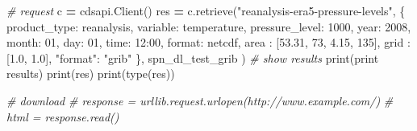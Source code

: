 \documentclass[
]{book}
\newenvironment{Shaded}{\begin{snugshade}}{\end{snugshade}}
\newcommand{\BuiltInTok}[1]{#1}
\newcommand{\CommentTok}[1]{\textcolor[rgb]{0.56,0.35,0.01}{\textit{#1}}}
\newcommand{\DecValTok}[1]{\textcolor[rgb]{0.00,0.00,0.81}{#1}}
\newcommand{\FloatTok}[1]{\textcolor[rgb]{0.00,0.00,0.81}{#1}}
\newcommand{\NormalTok}[1]{#1}
\newcommand{\OperatorTok}[1]{\textcolor[rgb]{0.81,0.36,0.00}{\textbf{#1}}}
\newcommand{\StringTok}[1]{\textcolor[rgb]{0.31,0.60,0.02}{#1}}
\begin{document}
\begin{Shaded}
\begin{Highlighting}[]
\CommentTok{\# request}
\NormalTok{c }\OperatorTok{=}\NormalTok{ cdsapi.Client()}
\NormalTok{res }\OperatorTok{=}\NormalTok{ c.retrieve(}\StringTok{"reanalysis{-}era5{-}pressure{-}levels"}\NormalTok{,}
\NormalTok{  \{}
    \StringTok{\textquotesingle{}product\_type\textquotesingle{}}\NormalTok{: }\StringTok{\textquotesingle{}reanalysis\textquotesingle{}}\NormalTok{,}
    \StringTok{\textquotesingle{}variable\textquotesingle{}}\NormalTok{: }\StringTok{\textquotesingle{}temperature\textquotesingle{}}\NormalTok{,}
    \StringTok{\textquotesingle{}pressure\_level\textquotesingle{}}\NormalTok{: }\StringTok{\textquotesingle{}1000\textquotesingle{}}\NormalTok{,}
    \StringTok{\textquotesingle{}year\textquotesingle{}}\NormalTok{: }\StringTok{\textquotesingle{}2008\textquotesingle{}}\NormalTok{,}
    \StringTok{\textquotesingle{}month\textquotesingle{}}\NormalTok{: }\StringTok{\textquotesingle{}01\textquotesingle{}}\NormalTok{,}
    \StringTok{\textquotesingle{}day\textquotesingle{}}\NormalTok{: }\StringTok{\textquotesingle{}01\textquotesingle{}}\NormalTok{,}
    \StringTok{\textquotesingle{}time\textquotesingle{}}\NormalTok{: }\StringTok{\textquotesingle{}12:00\textquotesingle{}}\NormalTok{,}
    \StringTok{\textquotesingle{}format\textquotesingle{}}\NormalTok{: }\StringTok{\textquotesingle{}netcdf\textquotesingle{}}\NormalTok{,}
    \StringTok{\textquotesingle{}area\textquotesingle{}}\NormalTok{          : [}\FloatTok{53.31}\NormalTok{, }\DecValTok{73}\NormalTok{, }\FloatTok{4.15}\NormalTok{, }\DecValTok{135}\NormalTok{],}
    \StringTok{\textquotesingle{}grid\textquotesingle{}}\NormalTok{          : [}\FloatTok{1.0}\NormalTok{, }\FloatTok{1.0}\NormalTok{],}
    \StringTok{"format"}\NormalTok{: }\StringTok{"grib"}
\NormalTok{  \},}
\NormalTok{  spn\_dl\_test\_grib}
\NormalTok{)}
\CommentTok{\# show results}
\BuiltInTok{print}\NormalTok{(}\StringTok{\textquotesingle{}print results\textquotesingle{}}\NormalTok{)}
\BuiltInTok{print}\NormalTok{(res)}
\BuiltInTok{print}\NormalTok{(}\BuiltInTok{type}\NormalTok{(res))}

\CommentTok{\# download}
\CommentTok{\# response = urllib.request.urlopen(\textquotesingle{}http://www.example.com/\textquotesingle{})}
\CommentTok{\# html = response.read()}
\end{Highlighting}
\end{Shaded}
\end{document}
